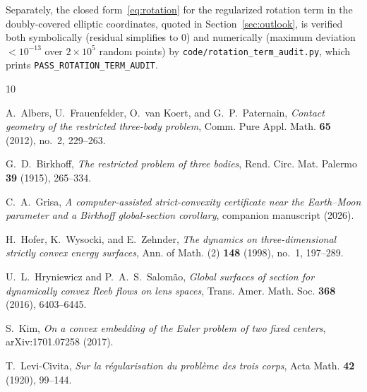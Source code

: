 \documentclass[11pt,reqno]{amsart}
\theoremstyle{plain}
\theoremstyle{definition}
\begin{document}
Separately, the closed form~\eqref{eq:rotation} for the regularized rotation term in the doubly-covered elliptic coordinates, quoted in Section~\ref{sec:outlook}, is verified both symbolically (residual simplifies to $0$) and numerically (maximum deviation $<10^{-13}$ over $2\times10^5$ random points) by \texttt{code/rotation\_term\_audit.py}, which prints \texttt{PASS\_ROTATION\_TERM\_AUDIT}.

\begin{thebibliography}{10}

A.~Albers, U.~Frauenfelder, O.~van Koert, and G.~P.~Paternain,
\emph{Contact geometry of the restricted three-body problem},
Comm. Pure Appl. Math. \textbf{65} (2012), no.~2, 229--263.

G.~D.~Birkhoff,
\emph{The restricted problem of three bodies},
Rend. Circ. Mat. Palermo \textbf{39} (1915), 265--334.

C.~A.~Grisa,
\emph{A computer-assisted strict-convexity certificate near the Earth--Moon parameter and a Birkhoff global-section corollary},
companion manuscript (2026).

H.~Hofer, K.~Wysocki, and E.~Zehnder,
\emph{The dynamics on three-dimensional strictly convex energy surfaces},
Ann. of Math. (2) \textbf{148} (1998), no.~1, 197--289.

U.~L.~Hryniewicz and P.~A.~S.~Salom\~ao,
\emph{Global surfaces of section for dynamically convex Reeb flows on lens spaces},
Trans. Amer. Math. Soc. \textbf{368} (2016), 6403--6445.

S.~Kim,
\emph{On a convex embedding of the Euler problem of two fixed centers},
arXiv:1701.07258 (2017).

T.~Levi-Civita,
\emph{Sur la r\'egularisation du probl\`eme des trois corps},
Acta Math. \textbf{42} (1920), 99--144.

\end{thebibliography}
\end{document}
